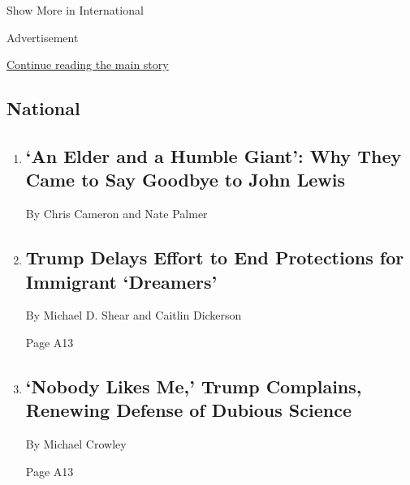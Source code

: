 Show More in International

Advertisement

\protect\hyperlink{after-mid2}{Continue reading the main story}

\hypertarget{national}{%
\subsection{National}\label{national}}

\begin{enumerate}
\def\labelenumi{\arabic{enumi}.}
\item
  \href{/interactive/2020/07/28/multimedia/john-lewis-capitol-memorial.html}{}

  \hypertarget{an-elder-and-a-humble-giant-why-they-came-to-say-goodbye-to-john-lewis}{%
  \subsection{`An Elder and a Humble Giant': Why They Came to Say
  Goodbye to John
  Lewis}\label{an-elder-and-a-humble-giant-why-they-came-to-say-goodbye-to-john-lewis}}

  By Chris Cameron and Nate Palmer
\item
  \href{/2020/07/28/us/politics/trump-daca.html}{}

  \hypertarget{trump-delays-effort-to-end-protections-for-immigrant-dreamers}{%
  \subsection{Trump Delays Effort to End Protections for Immigrant
  `Dreamers'}\label{trump-delays-effort-to-end-protections-for-immigrant-dreamers}}

  By Michael D. Shear and Caitlin Dickerson

  Page A13
\item
  \href{/2020/07/28/us/politics/trump-nobody-likes-me-walks-out-briefing.html}{}

  \hypertarget{nobody-likes-me-trump-complains-renewing-defense-of-dubious-science}{%
  \subsection{`Nobody Likes Me,' Trump Complains, Renewing Defense of
  Dubious
  Science}\label{nobody-likes-me-trump-complains-renewing-defense-of-dubious-science}}

  By Michael Crowley

  Page A13
\end{enumerate}

